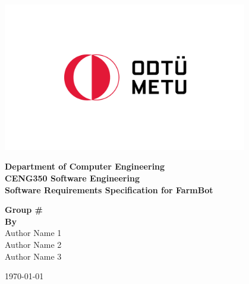 \begin{titlepage}
   \begin{center}

       \includegraphics[width=0.8\textwidth]{Figures/metu_logo.png}
       \vspace{0.0cm}
     
            
        \textbf{\LARGE Department of  Computer Engineering} \\
        \vspace{0.5cm}
        \textbf{\LARGE CENG350 Software Engineering}\\
        \vspace{0.5cm} 
        \textbf{\LARGE Software Requirements Specification for FarmBot} \\
        \vspace{1.5cm} 
 

        \textbf{Group \#}\\
       \textbf{\textbf{By}} \\Author Name 1 \\ Author Name 2 \\ Author Name 3 \\
       

       \vspace{1.5cm}
            
    
\vspace{0.5cm}
            


\today            
   \end{center}
\end{titlepage}